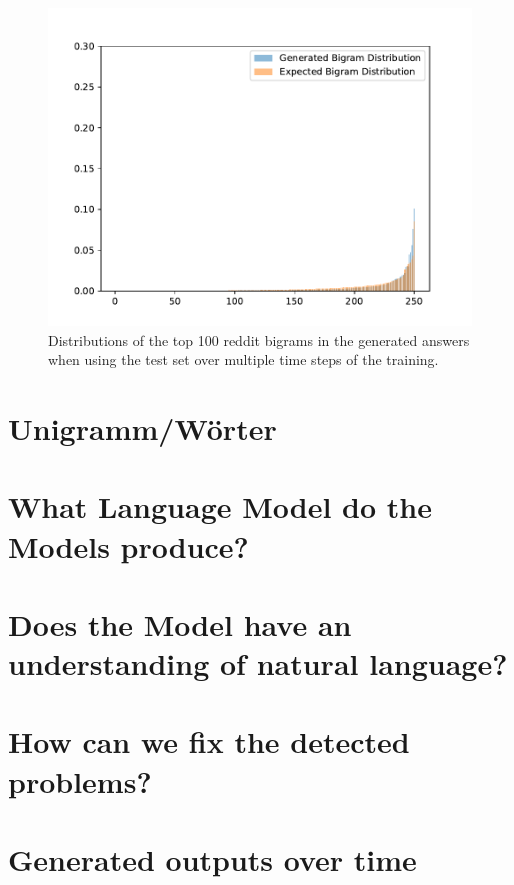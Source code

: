 \begin{figure}[H]
	\centering
	\small
	\endminipage\hfill
	\includegraphics[width=\linewidth]{img/plots/reddit/bigram_distribution_comparison_step_3000000.pdf}
	\centering
	\small
	\endminipage\hfill
	\caption{Distributions of the top 100 reddit bigrams in the generated answers when using the test set over multiple time steps of the training.}
	\label{results:ngram:distributions:reddit}
\end{figure}

\section{Unigramm/Wörter}


\section{What Language Model do the Models produce?}
\blindtext

\section{Does the Model have an understanding of natural language?}
\blindtext

\section{How can we fix the detected problems?}
\blindtext



\section{Generated outputs over time}
\blindtext

